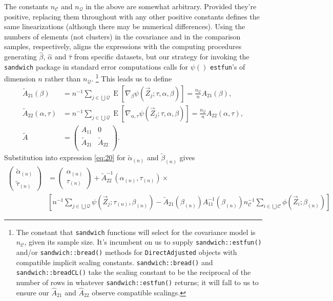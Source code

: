\documentclass{article}
\newcommand{\EE}{\operatorname{E}}
\begin{document}
The constants $n_{\mathcal{C}}$ and
$n_{\mathcal{Q}}$ in the above are somewhat
arbitrary.  Provided they're positive, replacing them throughout with any other
positive constants defines the same linearizations (although there may
be numerical differences).  
Using the numbers of elements (not
clusters) in the covariance and in the comparison samples,
respectively, aligns the expressions with the computing procedures
generating $\hat\beta$, $\hat\alpha$ and $\hat\tau$ from specific
datasets, but our strategy for invoking the \texttt{sandwich} package
in standard error computations calls for  $\psi()$ \texttt{estfun}'s
of dimension $n$ rather than $n_{\mathcal{Q}}$.%
\footnote{%
  The constant that \texttt{sandwich}
  functions will select for the covariance model is $n_{\mathcal{C}}$, given its sample
  size.  It's incumbent on us to supply \texttt{sandwich::estfun()}
  and/or \texttt{sandwich::bread()} methods for
  \texttt{DirectAdjusted} objects with compatible implicit scaling
  constants. \texttt{sandwich::bread()} and
  \texttt{sandwich::breadCL()} take the scaling constant to be the
  reciprocal of the number of rows in whatever
  \texttt{sandwich::estfun()} returns; it will fall to us to ensure
  our $\hat{A}_{21}$ and $\hat{A}_{22}$ observe compatible scalings.}%
 This leads us to
define
\begin{align*}
  \tilde{A}_{21}(\beta) &= n^{-1} \sum_{j\in \bigcup
        \mathcal{Q}}\EE[ \nabla_{\beta}\psi(\vec{Z}_{j};
        \tau, \alpha, \beta )] = \frac{n_{\mathcal{Q}}}{n} {A}_{21}(\beta),\\
  \tilde{A}_{22}(\alpha, \tau) &= n^{-1} \sum_{j\in \bigcup
        \mathcal{Q}}\EE[ \nabla_{\alpha, \tau}\psi(\vec{Z}_{j};
        \tau, \alpha, \beta )] = \frac{n_{\mathcal{Q}}}{n}
                                 {A}_{22}(\alpha, \tau),\\
  \tilde{A} &= \left(
              \begin{array}{cc}
                A_{11} & 0 \\
                \tilde{A}_{21} & \tilde{A}_{22}\\
              \end{array}
\right).
\end{align*}
Substitution into  expression \eqref{eq:20} for
$\tilde{\alpha}_{(n)}$ and $\tilde{\beta}_{(n)}$ gives
\begin{align}
      \left(\begin{array}{c}\tilde{\alpha}_{(n)}\\ \tilde{\tau}_{(n)} \end{array}\right)         &=\left(\begin{array}{c}\alpha_{(n)}\\
                         \tau_{(n)} \end{array}\right) +
    \tilde{A}_{22}^{-1}(\alpha_{(n)}, \tau_{(n)})\times \label{eq:21}\\
    & \left[
                 n^{-1}\sum_{j\in \bigcup
                 \mathcal{Q}}\psi(\vec{Z}_{j};
                 \tau_{(n)},\beta_{(n)} ) -
      \tilde{A}_{21}(\beta_{(n)})
      {A}_{11}^{-1}(\beta_{(n)})n_{\mathcal{C}}^{-1}\sum_{i\in \bigcup
      \mathcal{C}}\phi(\vec{Z}_{i}; \beta_{(n)})\right] \nonumber
\end{align}
\end{document}
